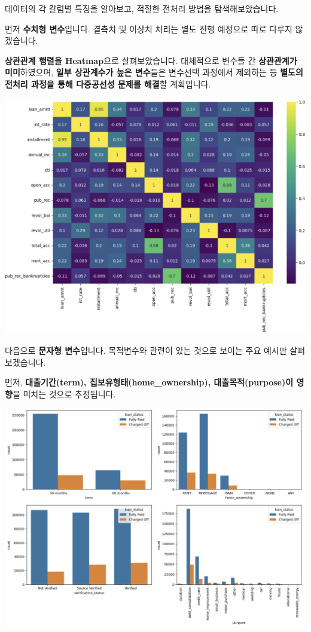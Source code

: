 \documentclass[
  a4paper,
  DIV=11,
  numbers=noendperiod]{scrreprt}
\begin{document}
데이터의 각 칼럼별 특징을 알아보고, 적절한 전처리 방법을
탐색해보았습니다.

먼저 \textbf{수치형 변수}입니다. 결측치 및 이상치 처리는 별도 진행
예정으로 따로 다루지 않겠습니다.

\textbf{상관관계 행렬을 Heatmap}으로 살펴보았습니다. 대체적으로 변수들
간 \textbf{상관관계가 미미}하였으며, \textbf{일부 상관계수가 높은
변수}들은 변수선택 과정에서 제외하는 등 \textbf{별도의 전처리 과정을
통해 다중공선성 문제를 해결}할 계획입니다.

\begin{center}
\includegraphics{image/ml3_heatmap.png}
\end{center}

\newpage

다음으로 \textbf{문자형 변수}입니다. 목적변수와 관련이 있는 것으로
보이는 주요 예시만 살펴보겠습니다.

먼저, \textbf{대출기간(term), 집보유형태(home\_ownership),
대출목적(purpose)이 영향}을 미치는 것으로 추정됩니다.

\begin{center}
\includegraphics{image/ml5_4plot.png}
\end{center}
\end{document}
